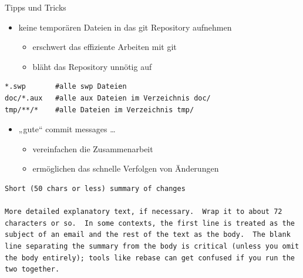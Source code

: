 \begin{frame}{Tipps und Tricks}
  \begin{itemize}
    \item keine temporären Dateien in das git Repository aufnehmen
    \begin{itemize}
      \item erschwert das effiziente Arbeiten mit git
      \item bläht das Repository unnötig auf
    \end{itemize}
  \end{itemize}
  \lstset{frame=single}
  \begin{lstlisting}[caption=Inhalt der Datei .gitignore]
*.swp       #alle swp Dateien
doc/*.aux   #alle aux Dateien im Verzeichnis doc/
tmp/**/*    #alle Dateien im Verzeichnis tmp/
  \end{lstlisting}
  \framebreak

  \begin{itemize}
    \item „gute“ commit messages \ldots
    \begin{itemize}
      \item vereinfachen die Zusammenarbeit
      \item ermöglichen das schnelle Verfolgen von Änderungen
    \end{itemize}
  \end{itemize}
  \begin{lstlisting}[frame=single,caption={Quelle: \url{http://tbaggery.com/2008/04/19/a-note-about-git-commit-messages.html}}]
Short (50 chars or less) summary of changes

More detailed explanatory text, if necessary.  Wrap it to about 72
characters or so.  In some contexts, the first line is treated as the
subject of an email and the rest of the text as the body.  The blank
line separating the summary from the body is critical (unless you omit
the body entirely); tools like rebase can get confused if you run the
two together.
  \end{lstlisting}
  \framebreak


\end{frame}
